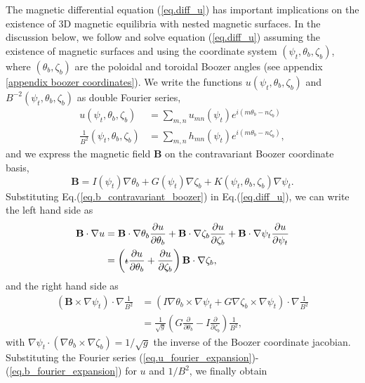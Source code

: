 \documentclass[my_thesis.tex]{subfiles}
\begin{document}
The magnetic differential equation (\ref{eq.diff_u}) has important implications on the existence of 3D magnetic equilibria with nested magnetic surfaces. In the discussion below, we follow \citet{helanderTheoryPlasmaConfinement2014} and solve equation (\ref{eq.diff_u}) assuming the existence of magnetic surfaces and using the coordinate system $(\psi_t,\theta_b,\zeta_b)$, where $(\theta_b,\zeta_b)$ are the poloidal and toroidal Boozer angles (see appendix \ref{appendix boozer coordinates}). We write the functions $u(\psi_t,\theta_b,\zeta_b)$ and $B^{-2}(\psi_t,\theta_b,\zeta_b)$ as double Fourier series,
\begin{align}
	u(\psi_t,\theta_b,\zeta_b) &= \sum_{m,n} u_{mn}(\psi_t) e^{i(m\theta_b-n\zeta_b)}\label{eq.u_fourier_expansion}\\
	\frac{1}{B^2}(\psi_t,\theta_b,\zeta_b) &= \sum_{m,n} h_{mn}(\psi_t) e^{i(m\theta_b-n\zeta_b)}\label{eq.b_fourier_expansion},
\end{align}
and we express the magnetic field $\mathbf{B}$ on the contravariant Boozer coordinate basis,
\begin{equation}
	\mathbf{B} = I(\psi_t)\nabla\theta_b + G(\psi_t)\nabla\zeta_b + K(\psi_t,\theta_b,\zeta_b)\nabla\psi_t.\label{eq.b_contravariant_boozer}
\end{equation}
Substituting Eq.(\ref{eq.b_contravariant_boozer}) in Eq.(\ref{eq.diff_u}), we can write the left hand side as
\begin{align}
	\mathbf{B}\cdot\nabla u &= \mathbf{B}\cdot\nabla\theta_b\frac{\partial u}{\partial \theta_b} + \mathbf{B}\cdot\nabla\zeta_b\frac{\partial u}{\partial \zeta_b} + \mathbf{B}\cdot\nabla\psi_t\frac{\partial u}{\partial \psi_t} \\
	&= \left(\text{$\iota\!\!$-} \frac{\partial u}{\partial \theta_b} + \frac{\partial u}{\partial \zeta_b}\right)\mathbf{B}\cdot\nabla\zeta_b,
\end{align}
and the right hand side as
\begin{align}
	\left(\mathbf{B}\times\nabla\psi_t\right)\cdot\nabla \frac{1}{B^2} &= \left(I\nabla\theta_b\times\nabla\psi_t + G\nabla\zeta_b\times\nabla\psi_t\right)\cdot\nabla\frac{1}{B^2}\\
	&= \frac{1}{\sqrt{g}}\left(G\frac{\partial}{\partial\theta_b} - I \frac{\partial}{\partial \zeta_b}\right)\frac{1}{B^2},
\end{align}
with $\nabla\psi_t\cdot(\nabla\theta_b\times\nabla\zeta_b) = 1/\sqrt{g}$ the inverse of the Boozer coordinate jacobian. Substituting the Fourier series (\ref{eq.u_fourier_expansion})-(\ref{eq.b_fourier_expansion}) for $u$ and $1/B^2$, we finally obtain
\end{document}
